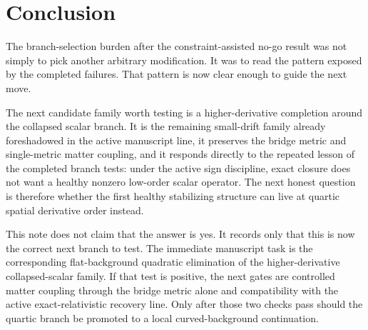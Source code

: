 \documentclass[11pt]{article}
\begin{document}
\section{Conclusion}

The branch-selection burden after the constraint-assisted no-go result was not simply to pick another arbitrary modification. It was to read the pattern exposed by the completed failures. That pattern is now clear enough to guide the next move.

The next candidate family worth testing is a higher-derivative completion around the collapsed scalar branch. It is the remaining small-drift family already foreshadowed in the active manuscript line, it preserves the bridge metric and single-metric matter coupling, and it responds directly to the repeated lesson of the completed branch tests: under the active sign discipline, exact closure does not want a healthy nonzero low-order scalar operator. The next honest question is therefore whether the first healthy stabilizing structure can live at quartic spatial derivative order instead.

This note does not claim that the answer is yes. It records only that this is now the correct next branch to test. The immediate manuscript task is the corresponding flat-background quadratic elimination of the higher-derivative collapsed-scalar family. If that test is positive, the next gates are controlled matter coupling through the bridge metric alone and compatibility with the active exact-relativistic recovery line. Only after those two checks pass should the quartic branch be promoted to a local curved-background continuation.
\end{document}
